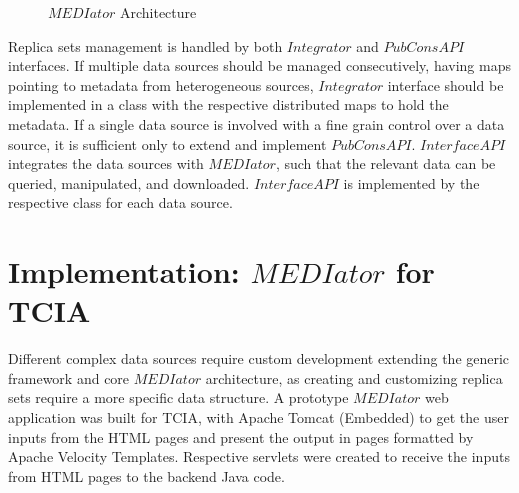 \documentclass[letterpaper, 10 pt, conference]{ieeeconf}  %
\begin{document}
	\vspace{-13pt}
	\begin{figure}[ht]
		\begin{center}
		\end{center}
		\vspace{-17pt}
		
		\caption{$MEDIator$ Architecture}
		\label{fig:arch}
		\vspace{-13pt}
		
	\end{figure}
	
Replica sets management is handled by both $Integrator$ and $PubConsAPI$ interfaces. If multiple data sources should be managed consecutively, having maps pointing to metadata from heterogeneous sources, $Integrator$ interface should be implemented in a class with the respective distributed maps to hold the metadata. If a single data source is involved with a fine grain control over a data source, it is sufficient only to extend and implement $PubConsAPI$. $InterfaceAPI$ integrates the data sources with $MEDIator$, such that the relevant data can be queried, manipulated, and downloaded. $InterfaceAPI$ is implemented by the respective class for each data source.


\section{Implementation: $MEDIator$ for TCIA}
Different complex data sources require custom development extending the generic framework and core $MEDIator$ architecture, as creating and customizing replica sets require a more specific data structure. A prototype $MEDIator$ web application was built for TCIA, with Apache Tomcat (Embedded) to get the user inputs from the HTML pages and present the output in pages formatted by Apache Velocity Templates. Respective servlets were created to receive the inputs from HTML pages to the backend Java code.
 
\end{document}
